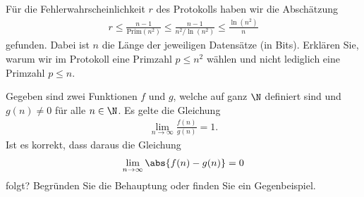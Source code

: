 \begin{questions}
\droptotalpoints


\question[2]
Für die Fehlerwahrscheinlichkeit $r$ des Protokolls haben wir die Abschätzung
\begin{align*}
    r \leq \frac{n-1}{\text{Prim}(n^2)}\leq \frac{n-1}{n^2/\ln(n^2)}\leq\frac{\ln(n^2)}{n}
\end{align*}
gefunden. Dabei ist $n$ die Länge der jeweiligen Datensätze (in Bits). Erklären Sie, warum wir im Protokoll eine Primzahl $p \leq n^2$ wählen und nicht lediglich eine Primzahl $p \leq n$.

\question[2]
Gegeben sind zwei Funktionen $f$ und $g$, welche auf ganz $\N$ definiert sind und $g(n) \neq 0$ für alle $n\in\N$. Es gelte die Gleichung
\begin{align*}
  \lim_{n\to\infty}\frac{f(n)}{g(n)} = 1.
\end{align*}
Ist es korrekt, dass daraus die Gleichung
\begin{align*}
  \lim_{n\to\infty} \abs{f(n) - g(n)} = 0
\end{align*}
folgt? Begründen Sie die Behauptung oder finden Sie ein Gegenbeispiel.
\end{questions}
